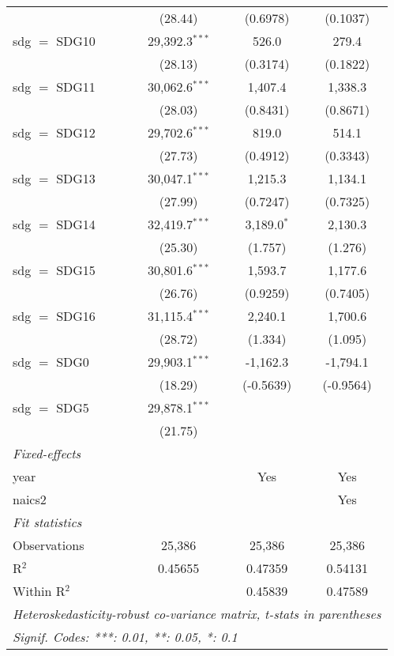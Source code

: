 \begin{tabular}{lccc}
                 & (28.44)          & (0.6978)       & (0.1037)\\   
   sdg $=$ SDG10 & 29,392.3$^{***}$ & 526.0          & 279.4\\   
                 & (28.13)          & (0.3174)       & (0.1822)\\   
   sdg $=$ SDG11 & 30,062.6$^{***}$ & 1,407.4        & 1,338.3\\   
                 & (28.03)          & (0.8431)       & (0.8671)\\   
   sdg $=$ SDG12 & 29,702.6$^{***}$ & 819.0          & 514.1\\   
                 & (27.73)          & (0.4912)       & (0.3343)\\   
   sdg $=$ SDG13 & 30,047.1$^{***}$ & 1,215.3        & 1,134.1\\   
                 & (27.99)          & (0.7247)       & (0.7325)\\   
   sdg $=$ SDG14 & 32,419.7$^{***}$ & 3,189.0$^{*}$  & 2,130.3\\   
                 & (25.30)          & (1.757)        & (1.276)\\   
   sdg $=$ SDG15 & 30,801.6$^{***}$ & 1,593.7        & 1,177.6\\   
                 & (26.76)          & (0.9259)       & (0.7405)\\   
   sdg $=$ SDG16 & 31,115.4$^{***}$ & 2,240.1        & 1,700.6\\   
                 & (28.72)          & (1.334)        & (1.095)\\   
   sdg $=$ SDG0  & 29,903.1$^{***}$ & -1,162.3       & -1,794.1\\   
                 & (18.29)          & (-0.5639)      & (-0.9564)\\   
   sdg $=$ SDG5  & 29,878.1$^{***}$ &                &   \\   
                 & (21.75)          &                &   \\   
   \midrule
   \emph{Fixed-effects}\\
   year          &                  & Yes            & Yes\\  
   naics2        &                  &                & Yes\\  
   \midrule
   \emph{Fit statistics}\\
   Observations  & 25,386           & 25,386         & 25,386\\  
   R$^2$         & 0.45655          & 0.47359        & 0.54131\\  
   Within R$^2$  &                  & 0.45839        & 0.47589\\  
   \midrule \midrule
   \multicolumn{4}{l}{\emph{Heteroskedasticity-robust co-variance matrix, t-stats in parentheses}}\\
   \multicolumn{4}{l}{\emph{Signif. Codes: ***: 0.01, **: 0.05, *: 0.1}}\\
\end{tabular}
\par\endgroup


